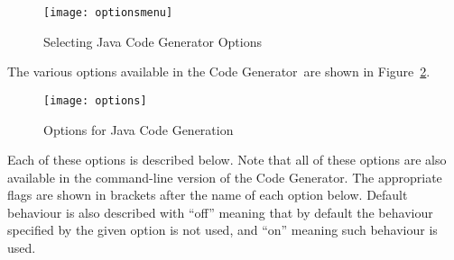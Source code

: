 \documentclass[\pformat,11pt]{article}
\newcommand{\tcg}{the Code Generator}
\begin{document}
\begin{figure}[H]
\begin{center}
\texttt{[image: optionsmenu]}
\caption{Selecting Java Code Generator Options}\label{fig:optionsmenu}
\end{center}
\end{figure}

The various options available in \tcg\ are shown in
Figure~\ref{fig:options}. 
\begin{figure}
\begin{center}
\texttt{[image: options]}
\caption{Options for Java Code Generation}\label{fig:options}
\end{center}
\end{figure}
Each of these options is described below. Note that all of these
options are also available in the command-line version of \tcg. The
appropriate flags are shown in brackets after the name of each option
below. Default behaviour is also described with ``off'' meaning that
by default the behaviour specified by the given option is not used,
and ``on'' meaning such behaviour is used.
\end{document}
